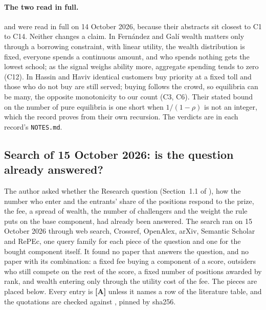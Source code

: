 \documentclass[11pt,a4paper]{article}
\begin{document}
\paragraph{The two read in full.} \citet{FernandezGali1999} and
\citet{HassinHaviv1997} were read in full on 14 October 2026, because their
abstracts sit closest to C1 to C14. Neither changes a claim. In Fernández and
Galí wealth matters only through a borrowing constraint, with linear utility,
the wealth distribution is fixed, everyone spends a continuous amount, and who
spends nothing gets the lowest school; as the signal weighs ability more,
aggregate spending tends to zero (C12). In Hassin and Haviv identical customers
buy priority at a fixed toll and those who do not buy are still served; buying
follows the crowd, so equilibria can be many, the opposite monotonicity to our
count (C3, C6). Their stated bound on the number of pure equilibria is one
short when $1/(1-\rho)$ is not an integer, which the record proves from their
own recursion. The verdicts are in each record's \texttt{NOTES.md}.

\subsection{Search of 15 October 2026: is the question already answered?}
\label{sec:search-answered}

The author asked whether the Research question (Section~1.1 of
),
how the number who enter and the entrants' share of the positions respond to
the prize, the fee, a spread of wealth, the number of challengers and the
weight the rule puts on the base component, had already been answered. The
search ran on 15 October 2026 through web search, Crossref, OpenAlex, arXiv,
Semantic Scholar and RePEc, one query family for each piece of the question
and one for the bought component itself. It found no paper that answers the
question, and no paper with its combination: a fixed fee buying a component of
a score, outsiders who still compete on the rest of the score, a fixed number
of positions awarded by rank, and wealth entering only through the utility cost
of the fee. The pieces are placed below. Every entry is \textbf{[A]} unless it
names a row of the literature table, and the quotations are checked against
, pinned by sha256.
\end{document}
